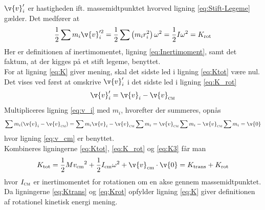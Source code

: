 $\v{v}_i'$ er hastigheden ift. massemidtpunktet hvorved ligning \eqref{eq:Stift-Legeme} gælder. Det medfører at
\begin{equation} \label{eq:K_rot}
     \frac{1}{2}\sum m_i\v{v}_i'^2=\frac{1}{2}\sum\left(m_ir_i^2\right)\omega^2=\frac{1}{2}I\omega^2 = K_\text{rot}
\end{equation}
Her er definitionen af inertimomentet, ligning \eqref{eq:Inertimoment}, samt det faktum, at der kigges på et stift legeme, benyttet.\\
For at ligning \eqref{eq:K} giver mening, skal det sidste led i ligning \eqref{eq:Ktot} være nul. Det vises ved først at omskrive $\v{v}_i'$ i det sidste led i ligning \eqref{eq:K_rot}
\begin{equation} \label{eq:v_i}
     \v{v}_i'=\v{v}_i-\v{v}_\textsc{cm}
\end{equation}
Multipliceres ligning \eqref{eq:v_i} med $m_i$, hvorefter der summeres, opnås
\begin{equation} \label{eq:K3}
     \sum m_i(\v{v}_i-\v{v}_\textsc{cm}) = \sum m_i\v{v}_i-\v{v}_\textsc{cm}\sum m_i = \v{v}_\textsc{cm}\sum m_i - \v{v}_\textsc{cm}\sum m_i = \v{0}
\end{equation}
hvor ligning \eqref{eq:v_cm} er benyttet. \\
Kombineres ligningerne \eqref{eq:Ktot}, \eqref{eq:K_rot} og \eqref{eq:K3} får man
\begin{equation} \label{eq:KinetiskEnergi}
     K_\text{tot} = \frac{1}{2}M{v_{\text{cm}}}^2 + \frac{1}{2}I_{\text{cm}}\omega^2 + \v{v}_{\text{cm}} \cdot \v{0} = K_{\text{trans}} + K_{\text{rot}}
\end{equation}
hvor $I_\textsc{cm}$ er inertimomentet for rotationen om en akse gennem massemidtpunktet. Da ligningerne \eqref{eq:Ktrans} og \eqref{eq:Krot} opfylder ligning \eqref{eq:K} giver definitionen af  rotationel kinetisk energi mening.

